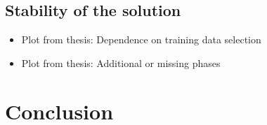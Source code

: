 \documentclass[prl, reprint, twocolumn]{revtex4-1}
\begin{document}
	\subsection{Stability of the solution}
	\begin{itemize}
		\item Plot from thesis: Dependence on training data selection
		\item Plot from thesis: Additional or missing phases
	\end{itemize}
	\blindtext[3]
	
	\section{Conclusion}
	\blindtext[3]
	
	
	
	
	
\end{document}
